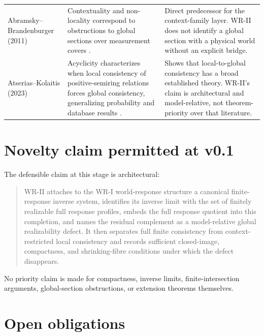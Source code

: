 \documentclass[11pt]{article}
\begin{document}
\begin{longtable}{>{\raggedright\arraybackslash}p{}
                  >{\raggedright\arraybackslash}p{}
                  >{\raggedright\arraybackslash}p{}}
Abramsky--Brandenburger (2011) &
Contextuality and non-locality correspond to obstructions to global sections
over measurement covers \cite{AbramskyBrandenburger2011}. &
Direct predecessor for the context-family layer. WR-II does not identify a
global section with a physical world without an explicit bridge. \\[5pt]

Atserias--Kolaitis (2023) &
Acyclicity characterizes when local consistency of positive-semiring relations
forces global consistency, generalizing probability and database results
\cite{AtseriasKolaitis2023}. &
Shows that local-to-global consistency has a broad established theory. WR-II's
claim is architectural and model-relative, not theorem-priority over that
literature. \\
\bottomrule
\end{longtable}

\section{Novelty claim permitted at v0.1}

The defensible claim at this stage is architectural:

\begin{quote}
WR-II attaches to the WR-I world-response structure a canonical finite-response
inverse system, identifies its inverse limit with the set of finitely realizable
full response profiles, embeds the full response quotient into this completion,
and names the residual complement as a model-relative global realizability
defect. It then separates full finite consistency from context-restricted local
consistency and records sufficient closed-image, compactness, and shrinking-fibre
conditions under which the defect disappears.
\end{quote}

No priority claim is made for compactness, inverse limits, finite-intersection
arguments, global-section obstructions, or extension theorems themselves.

\section{Open obligations}
\end{document}
